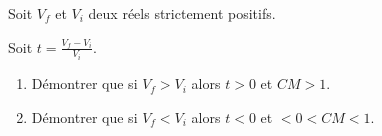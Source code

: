 
Soit $V_f$ et $V_i$ deux réels strictement positifs.

Soit $t = \frac{V_f-V_i}{V_i}$.

\begin{enumerate}
\item Démontrer que si $V_f >V_i$ alors $t>0$ et $CM > 1$.
\item Démontrer que si $V_f <V_i$ alors $t<0$ et $<0 < CM < 1$.
\end{enumerate}